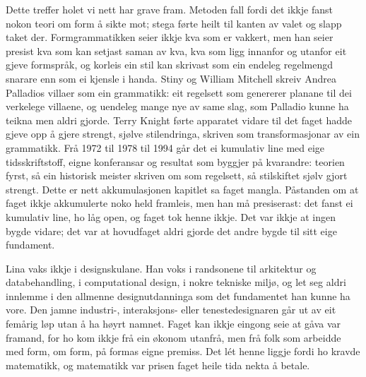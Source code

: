 Dette treffer holet vi nett har grave fram. Metoden fall fordi det ikkje fanst nokon teori om form å sikte mot; stega førte heilt til kanten av valet og slapp taket der. Formgrammatikken seier ikkje kva som er vakkert, men han seier presist kva som kan setjast saman av kva, kva som ligg innanfor og utanfor eit gjeve formspråk, og korleis ein stil kan skrivast som ein endeleg regelmengd snarare enn som ei kjensle i handa. Stiny og William Mitchell skreiv Andrea Palladios villaer som ein grammatikk: eit regelsett som genererer planane til dei verkelege villaene, og uendeleg mange nye av same slag, som Palladio kunne ha teikna men aldri gjorde\autocite{stinymitchell1978}. Terry Knight førte apparatet vidare til det faget hadde gjeve opp å gjere strengt, sjølve stilendringa, skriven som transformasjonar av ein grammatikk\autocite{knight1994}. Frå 1972 til 1978 til 1994 går det ei kumulativ line med eige tidsskriftstoff, eigne konferansar og resultat som byggjer på kvarandre: teorien fyrst, så ein historisk meister skriven om som regelsett, så stilskiftet sjølv gjort strengt. Dette er nett akkumulasjonen kapitlet sa faget mangla. Påstanden om at faget ikkje akkumulerte noko held framleis, men han må presiserast: det fanst ei kumulativ line, ho låg open, og faget tok henne ikkje. Det var ikkje at ingen bygde vidare; det var at hovudfaget aldri gjorde det andre bygde til sitt eige fundament.

Lina vaks ikkje i designskulane. Han voks i randsonene til arkitektur og databehandling, i computational design, i nokre tekniske miljø, og let seg aldri innlemme i den allmenne designutdanninga som det fundamentet han kunne ha vore. Den jamne industri-, interaksjons- eller tenestedesignaren går ut av eit femårig løp utan å ha høyrt namnet. Faget kan ikkje eingong seie at gåva var framand, for ho kom ikkje frå ein økonom utanfrå, men frå folk som arbeidde med form, om form, på formas eigne premiss. Det lét henne liggje fordi ho kravde matematikk, og matematikk var prisen faget heile tida nekta å betale.

\vignett

